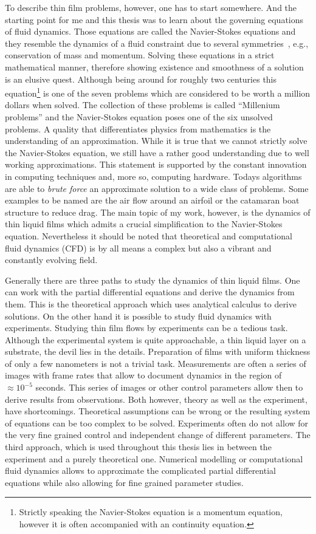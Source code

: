 To describe thin film problems, however, one has to start somewhere.
And the starting point for me and this thesis was to learn about the governing equations of fluid dynamics. 
Those equations are called the Navier-Stokes equations and they resemble the dynamics of a fluid constraint due to several symmetries~\cite{Navier, Stokes}, e.g., conservation of mass and momentum.
Solving these equations in a strict mathematical manner, therefore showing existence and smoothness of a solution is an elusive quest. 
Although being around for roughly two centuries this equation\footnote{Strictly speaking the Navier-Stokes equation is a momentum equation, however it is often accompanied with an continuity equation.} is one of the seven problems which are considered to be worth a million dollars when solved. 
The collection of these problems is called ``Millenium problems'' and the Navier-Stokes equation poses one of the six unsolved problems.
A quality that differentiates physics from mathematics is the understanding of an approximation.
While it is true that we cannot strictly solve the Navier-Stokes equation, we still have a rather good understanding due to well working approximations.
This statement is supported by the constant innovation in computing techniques and, more so, computing hardware. 
Todays algorithms are able to \textit{brute force} an approximate solution to a wide class of problems.  
Some examples to be named are the air flow around an airfoil or the catamaran boat structure to reduce drag. 
The main topic of my work, however, is the dynamics of thin liquid films which admits a crucial simplification to the Navier-Stokes equation. 
Nevertheless it should be noted that theoretical and computational fluid dynamics (CFD) is by all means a complex but also a vibrant and constantly evolving field.

Generally there are three paths to study the dynamics of thin liquid films.
One can work with the partial differential equations and derive the dynamics from them. 
This is the theoretical approach which uses analytical calculus to derive solutions.
On the other hand it is possible to study fluid dynamics with experiments.
Studying thin film flows by experiments can be a tedious task.
Although the experimental system is quite approachable, a thin liquid layer on a substrate, the devil lies in the details.
Preparation of films with uniform thickness of only a few nanometers is not a trivial task.
Measurements are often a series of images with frame rates that allow to document dynamics in the region of $\approx 10^{-5}$ seconds.
This series of images or other control parameters allow then to derive results from observations.
Both however, theory as well as the experiment, have shortcomings. 
Theoretical assumptions can be wrong or the resulting system of equations can be too complex to be solved. 
Experiments often do not allow for the very fine grained control and independent change of different parameters.
The third approach, which is used throughout this thesis lies in between the experiment and a purely theoretical one.
Numerical modelling or computational fluid dynamics allows to approximate the complicated partial differential equations while also allowing for fine grained parameter studies.

